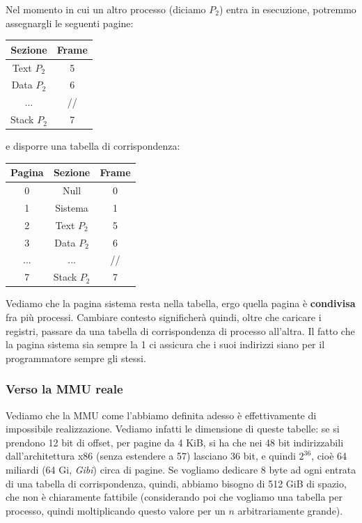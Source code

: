 \documentclass[a4paper,11pt]{article}
\begin{document}
Nel momento in cui un altro processo (diciamo $P_2$) entra in esecuzione, potremmo assegnargli le seguenti pagine:
\begin{table}[H]
	\center
	\begin{tabular} { | c | c | }
		\bfseries Sezione & \bfseries Frame \\
		\hline
		\textsf{Text} $P_2$ & 5 \\
		\textsf{Data} $P_2$ & 6 \\
		... & // \\
		\textsf{Stack} $P_2$ & 7 \\
	\end{tabular}
\end{table}
e disporre una tabella di corrispondenza:
\begin{table}[H]
	\center
	\begin{tabular} { | c | c | c | }
		\bfseries Pagina & \bfseries Sezione & \bfseries Frame \\
		\hline
		0 & \textsf{Null} & 0 \\
		1 & \textsf{Sistema} & 1 \\
		2 & \textsf{Text} $P_2$ & 5 \\
		3 & \textsf{Data} $P_2$ & 6 \\
		... &... & // \\
		7 & \textsf{Stack} $P_2$ & 7 \\
	\end{tabular}
\end{table}

Vediamo che la pagina sistema resta nella tabella, ergo quella pagina è \textbf{condivisa} fra più processi.
Cambiare contesto significherà quindi, oltre che caricare i registri, passare da una tabella di corrispondenza di processo all'altra.
Il fatto che la pagina sistema sia sempre la 1 ci assicura che i suoi indirizzi siano per il programmatore sempre gli stessi.

\subsubsection{Verso la MMU reale}
Vediamo che la MMU come l'abbiamo definita adesso è effettivamente di impossibile realizzazione.
Vediamo infatti le dimensione di queste tabelle: se si prendono 12 bit di offset, per pagine da 4 KiB, si ha che nei 48 bit indirizzabili dall'architettura x86 (senza estendere a 57) lasciano 36 bit, e quindi $2^{36}$, cioè 64 miliardi (64 Gi, \textit{Gibi}) circa di pagine.
Se vogliamo dedicare 8 byte ad ogni entrata di una tabella di corrispondenza, quindi, abbiamo bisogno di 512 GiB di spazio, che non è chiaramente fattibile (considerando poi che vogliamo una tabella per processo, quindi moltiplicando questo valore per un $n$ arbitrariamente grande).
\end{document}

